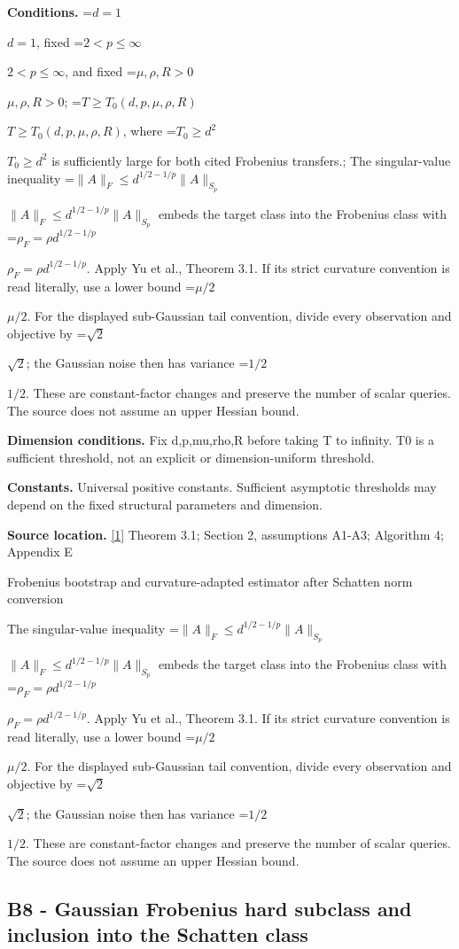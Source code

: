 \documentclass[10pt,a4paper]{article}
\newcommand{\AtlasMath}[1]{\par\begingroup\centering\setbox0=\hbox{$\displaystyle #1$}\ifdim\wd0>1.4\linewidth\typeout{ATLAS WIDE FORMULA: \the\wd0}\fi\ifdim\wd0>\linewidth\resizebox{\linewidth}{!}{\box0}\else\box0\fi\par\endgroup}
\newcommand{\AtlasInlineMath}[1]{\begingroup\setbox0=\hbox{$#1$}\ifdim\wd0>.4\linewidth\endgroup\AtlasMath{#1}\else\endgroup$#1$\fi}
\begin{document}
\textbf{Conditions.} \AtlasInlineMath{d=1}, fixed \AtlasInlineMath{2<p\le\infty}, and fixed \AtlasInlineMath{\mu,\rho,R>0}; \AtlasInlineMath{T\ge T_0(d,p,\mu,\rho,R)}, where \AtlasInlineMath{T_0\ge d^2} is sufficiently large for both cited Frobenius transfers.; The singular-value inequality \AtlasInlineMath{\|A\|_F\le d^{1/2-1/p}\|A\|_{S_p}} embeds the target class into the Frobenius class with \AtlasInlineMath{\rho_F=\rho d^{1/2-1/p}}. Apply Yu et al., Theorem 3.1. If its strict curvature convention is read literally, use a lower bound \AtlasInlineMath{\mu/2}. For the displayed sub-Gaussian tail convention, divide every observation and objective by \AtlasInlineMath{\sqrt2}; the Gaussian noise then has variance \AtlasInlineMath{1/2}. These are constant-factor changes and preserve the number of scalar queries. The source does not assume an upper Hessian bound.



\textbf{Dimension conditions.} Fix d,p,mu,rho,R before taking T to infinity. T0 is a sufficient threshold, not an explicit or dimension-uniform threshold.



\textbf{Constants.} Universal positive constants. Sufficient asymptotic thresholds may depend on the fixed structural parameters and dimension.



\textbf{Source location.} \href{https://papers.nips.cc/paper_files/paper/2024/file/b444ad72520a5f5c467343be88e352ed-Paper-Conference.pdf}{[1]} Theorem 3.1; Section 2, assumptions A1-A3; Algorithm 4; Appendix E



Frobenius bootstrap and curvature-adapted estimator after Schatten norm conversion



The singular-value inequality \AtlasInlineMath{\|A\|_F\le d^{1/2-1/p}\|A\|_{S_p}} embeds the target class into the Frobenius class with \AtlasInlineMath{\rho_F=\rho d^{1/2-1/p}}. Apply Yu et al., Theorem 3.1. If its strict curvature convention is read literally, use a lower bound \AtlasInlineMath{\mu/2}. For the displayed sub-Gaussian tail convention, divide every observation and objective by \AtlasInlineMath{\sqrt2}; the Gaussian noise then has variance \AtlasInlineMath{1/2}. These are constant-factor changes and preserve the number of scalar queries. The source does not assume an upper Hessian bound.



\subsection{B8 - Gaussian Frobenius hard subclass and inclusion into the Schatten class}
\end{document}
